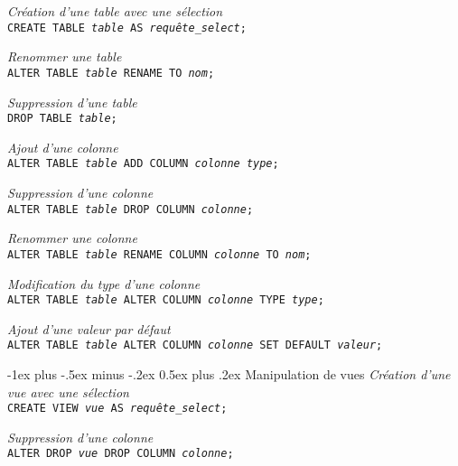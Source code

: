 \documentclass[10pt,landscape, a4paper]{article}
\makeatletter
\renewcommand{\section}{\@startsection{section}{1}{0mm}%
                                {-1ex plus -.5ex minus -.2ex}%
                                {0.5ex plus .2ex}%
                                {\normalfont\large\bfseries}}
\makeatother
\begin{document}
\begin{multicols}{3}
 \hspace{0.25em} {\scriptsize \emph{Création d'une table avec une sélection}} \\
\texttt{CREATE TABLE \emph{table} AS \emph{requête\_select};}

 \hspace{0.25em} {\scriptsize \emph{Renommer une table}} \\
\texttt{ALTER TABLE \emph{table} RENAME TO \emph{nom};}

 \hspace{0.25em} {\scriptsize \emph{Suppression d'une table}} \\
 \texttt{DROP TABLE \emph{table};}

 \hspace{0.25em} {\scriptsize \emph{Ajout d'une colonne}} \\
 \texttt{ALTER TABLE \emph{table} ADD COLUMN \emph{colonne type};}

 \hspace{0.25em} {\scriptsize \emph{Suppression d'une colonne}} \\
 \texttt{ALTER TABLE \emph{table} DROP COLUMN \emph{colonne};}

 \hspace{0.25em} {\scriptsize \emph{Renommer une colonne}} \\
 \texttt{ALTER TABLE \emph{table} RENAME COLUMN \emph{colonne} TO \emph{nom};}

 \hspace{0.25em} {\scriptsize \emph{Modification du type d'une colonne}} \\
 \texttt{ALTER TABLE \emph{table} ALTER COLUMN \emph{colonne} TYPE \emph{type};}

 \hspace{0.25em} {\scriptsize \emph{Ajout d'une  valeur par défaut}} \\
 \texttt{ALTER TABLE \emph{table} ALTER COLUMN \emph{colonne} SET DEFAULT \emph{valeur};}

\section{Manipulation de vues}
 \hspace{0.25em} {\scriptsize \emph{Création d'une vue avec une sélection}} \\
\texttt{CREATE VIEW \emph{vue} AS \emph{requête\_select};}

 \hspace{0.25em} {\scriptsize \emph{Suppression d'une colonne}} \\
 \texttt{ALTER DROP \emph{vue} DROP COLUMN \emph{colonne};}


\end{multicols}
\end{document}
